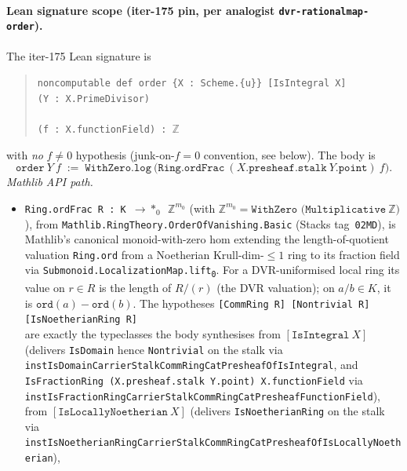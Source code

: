 \begin{definition}
  \paragraph{Lean signature scope (iter-175 pin, per analogist
  \texttt{dvr-rationalmap-order}).} The iter-175 Lean signature is
  \begin{quote}
    \texttt{noncomputable def order \{X : Scheme.\{u\}\} [IsIntegral X]\\
    \phantom{}\quad[IsLocallyNoetherian X] (Y : X.PrimeDivisor)\\
    \phantom{}\\
    \phantom{}\quad(f : X.functionField) : \(\mathbb Z\)}
  \end{quote}
  with \emph{no} \(f \neq 0\) hypothesis (junk-on-\(f = 0\) convention,
  see below). The body is
  \[
    \texttt{order}\ Y\ f \;:=\;
      \texttt{WithZero.log}\ \bigl(
        \texttt{Ring.ordFrac}\ (X.\texttt{presheaf.stalk}\ Y.\texttt{point})\ f
      \bigr).
  \]
  \emph{Mathlib API path.}
  \begin{itemize}
    \item \texttt{Ring.ordFrac R : K \(\to\!\!*_0\) \(\mathbb Z^{m_0}\)}
      (with \(\mathbb Z^{m_0} = \texttt{WithZero (Multiplicative}\ \mathbb Z)\)),
      from \texttt{Mathlib.RingTheory.OrderOfVanishing.Basic} (Stacks
      tag~\texttt{02MD}), is Mathlib's canonical monoid-with-zero hom
      extending the length-of-quotient valuation
      \texttt{Ring.ord} from a Noetherian Krull-dim-\(\leq 1\) ring to
      its fraction field via \texttt{Submonoid.LocalizationMap.lift\textsubscript{0}}.
      For a DVR-uniformised local ring its value on \(r \in R\) is the
      length of \(R/(r)\) (the DVR valuation); on \(a/b \in K\), it is
      \(\texttt{ord}(a) - \texttt{ord}(b)\). The hypotheses
      \texttt{[CommRing R] [Nontrivial R] [IsNoetherianRing R]\\
      [Ring.KrullDimLE 1 R]} are exactly the typeclasses the body
      synthesises from \([\texttt{IsIntegral}\ X]\) (delivers
      \texttt{IsDomain} hence \texttt{Nontrivial} on the stalk via
      \texttt{instIsDomainCarrierStalkCommRingCatPresheafOfIsIntegral},
      and \texttt{IsFractionRing (X.presheaf.stalk Y.point)
      X.functionField} via
      \texttt{instIsFractionRingCarrierStalkCommRingCatPresheafFunctionField}),
      from \([\texttt{IsLocallyNoetherian}\ X]\) (delivers
      \texttt{IsNoetherianRing} on the stalk via
      \texttt{instIsNoetherianRingCarrierStalkCommRingCatPresheafOfIsLocallyNoetherian}),

\end{itemize}
\end{definition}
